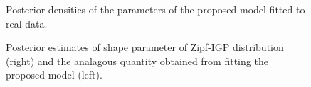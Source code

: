 \documentclass[
  sn-basic,
  10pt,
]{sn-jnl}
\theoremstyle{thmstyleone}
\theoremstyle{thmstyleone}
\theoremstyle{remark}
\theoremstyle{plain}
\theoremstyle{plain}
\theoremstyle{remark}
\begin{document}
\begin{figure}


\caption{\label{fig-parplot}Posterior densities of the parameters of the
proposed model fitted to real data.}

\end{figure}%

\begin{figure}[H]


\caption{\label{fig-shapes}Posterior estimates of shape parameter of
Zipf-IGP distribution (right) and the analagous quantity obtained from
fitting the proposed model (left).}

\end{figure}%
\end{document}
